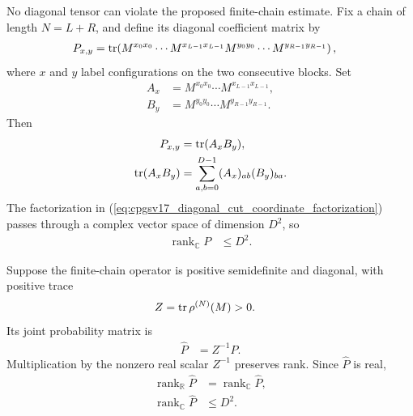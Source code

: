 \documentclass[11pt]{article}
\begin{document}
No diagonal tensor can violate the proposed finite-chain estimate. Fix a chain
of length $N=L+R$, and define its diagonal coefficient matrix by
\begin{align}
    P_{x,y}
        &=
        \operatorname{tr}\!\left(M^{x_0x_0}\cdots M^{x_{L-1}x_{L-1}}
            M^{y_0y_0}\cdots M^{y_{R-1}y_{R-1}}\right),
    \label{eq:cpgsv17_diagonal_cut_matrix}
\end{align}
where $x$ and $y$ label configurations on the two consecutive blocks. Set
\begin{align}
    A_x
        &= M^{x_0x_0}\cdots M^{x_{L-1}x_{L-1}},
    \label{eq:cpgsv17_left_block_matrix}\\
    B_y
        &= M^{y_0y_0}\cdots M^{y_{R-1}y_{R-1}}.
    \label{eq:cpgsv17_right_block_matrix}
\end{align}
Then
\begin{align}
    P_{x,y}
        &= \operatorname{tr}(A_xB_y),
    \label{eq:cpgsv17_diagonal_cut_trace_factorization}\\
    \operatorname{tr}(A_xB_y)
        &= \sum_{a,b=0}^{D-1}(A_x)_{ab}(B_y)_{ba}.
    \label{eq:cpgsv17_diagonal_cut_coordinate_factorization}
\end{align}
The factorization in
(\ref{eq:cpgsv17_diagonal_cut_coordinate_factorization}) passes through a
complex vector space of dimension $D^2$, so
\begin{align}
    \operatorname{rank}_{\mathbb C}P
        &\leq D^2.
    \label{eq:cpgsv17_diagonal_cut_complex_rank}
\end{align}

Suppose the finite-chain operator is positive semidefinite and diagonal, with
positive trace
\begin{align}
    Z
        &= \operatorname{tr}\rho^{(N)}(M)>0.
    \label{eq:cpgsv17_diagonal_chain_mass}
\end{align}
Its joint probability matrix is
\begin{align}
    \widehat P
        &= Z^{-1}P.
    \label{eq:cpgsv17_normalized_diagonal_distribution}
\end{align}
Multiplication by the nonzero real scalar $Z^{-1}$ preserves rank. Since
$\widehat P$ is real,
\begin{align}
    \operatorname{rank}_{\mathbb R}\widehat P
        &=
        \operatorname{rank}_{\mathbb C}\widehat P,
    \label{eq:cpgsv17_real_complex_distribution_rank}\\
    \operatorname{rank}_{\mathbb C}\widehat P
        &\leq D^2.
    \label{eq:cpgsv17_normalized_diagonal_rank_bound}
\end{align}
\end{document}
